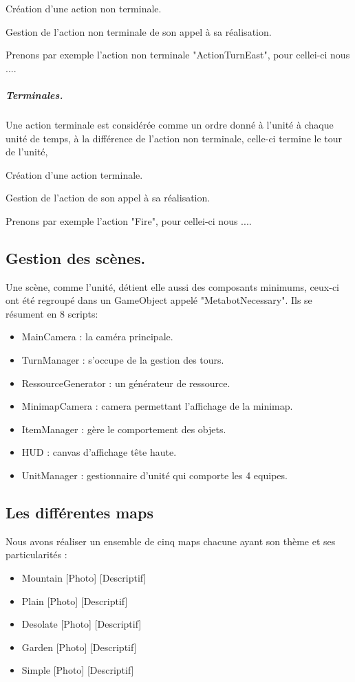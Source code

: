 \documentclass{report}
\begin{document}
Création d'une action non terminale.

Gestion de l'action non terminale de son appel à sa réalisation.

Prenons par exemple l'action non terminale "ActionTurnEast", pour cellei-ci nous ....

\subparagraph{Terminales.}

Une action terminale est considérée comme un ordre donné à l'unité à chaque unité de temps, à la différence de l'action non terminale, celle-ci termine le tour de l'unité, 

Création d'une action terminale.

Gestion de l'action de son appel à sa réalisation.

Prenons par exemple l'action "Fire", pour cellei-ci nous ....

\subsection{Gestion des scènes.}
Une scène, comme l'unité, détient elle aussi des composants minimums, ceux-ci ont été regroupé dans un GameObject appelé "MetabotNecessary".
Ils se résument en 8 scripts:
\begin{itemize}
\item MainCamera : la caméra principale.
\item TurnManager : s'occupe de la gestion des tours.
\item RessourceGenerator : un générateur de ressource.
\item MinimapCamera : camera permettant l'affichage de la minimap.
\item ItemManager : gère le comportement des objets.
\item HUD : canvas d'affichage tête haute.
\item UnitManager : gestionnaire d'unité qui comporte les 4 equipes.
\end{itemize}

\subsection{Les différentes maps}

Nous avons réaliser un ensemble de cinq maps chacune ayant son thème et ses particularités :
\begin{itemize}
\item Mountain
[Photo]
[Descriptif]
\item Plain
[Photo]
[Descriptif]
\item Desolate
[Photo]
[Descriptif]
\item Garden
[Photo]
[Descriptif]
\item Simple
[Photo]
[Descriptif]
\end{itemize}
\end{document}
